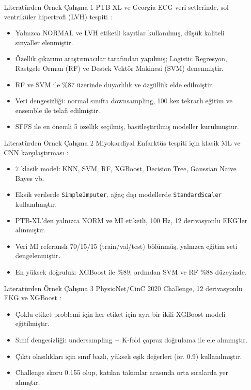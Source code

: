 \documentclass[aspectratio=169]{beamer}
\begin{document}
\begin{frame}{Literatürden Örnek Çalışma 1}
		PTB-XL ve Georgia ECG veri setlerinde, sol ventriküler hipertrofi (LVH) tespiti \cite{taconne2024-lvh}:
	\begin{itemize}
		\item Yalnızca NORMAL ve LVH etiketli kayıtlar kullanılmış, düşük kaliteli sinyaller elenmiştir.
		\item Özellik çıkarımı araştırmacılar tarafından yapılmış; Logistic Regresyon, Rastgele Orman (RF) ve Destek Vektör Makinesi (SVM) denenmiştir.
		\item RF ve SVM ile \%87 üzerinde duyarlılık ve özgüllük elde edilmiştir.
		\item Veri dengesizliği: normal sınıfta downsampling, 100 kez tekrarlı eğitim ve ensemble ile telafi edilmiştir.
		\item SFFS ile en önemli 5 özellik seçilmiş, basitleştirilmiş modeller kurulmuştur.
	\end{itemize}
\end{frame}

\begin{frame}{Literatürden Örnek Çalışma 2}
		Miyokardiyal Enfarktüs tespiti için klasik ML ve CNN karşılaştırması \cite{osterlund2025-mi-ptbxl}:
	\begin{itemize}
		\item 7 klasik model: KNN, SVM, RF, XGBoost, Decision Tree, Gaussian Naive Bayes vb.
		\item Eksik verilerde \texttt{SimpleImputer}, ağaç dışı modellerde \texttt{StandardScaler} kullanılmıştır.
		\item PTB-XL'den yalnızca NORM ve MI etiketli, 100 Hz, 12 derivasyonlu EKG'ler alınmıştır.
		\item Veri MI referanslı 70/15/15 (train/val/test) bölünmüş, yalnızca eğitim seti dengelenmiştir.
		\item En yüksek doğruluk: XGBoost ile \%89; ardından SVM ve RF \%88 düzeyinde.
	\end{itemize}
\end{frame}

\begin{frame}{Literatürden Örnek Çalışma 3}
		PhysioNet/CinC 2020 Challenge, 12 derivasyonlu EKG ve XGBoost \cite{raipal2020-xgboost-cinc}:
	\begin{itemize}
		\item Çoklu etiket problemi için her etiket için ayrı bir ikili XGBoost modeli eğitilmiştir.
		\item Sınıf dengesizliği: undersampling + K-fold çapraz doğrulama ile ele alınmıştır.
		\item Çıktı olasılıkları için sınıf bazlı, yüksek eşik değerleri (ör. 0.9) kullanılmıştır.
		\item Challenge skoru 0.155 olup, katılan takımlar arasında orta sıralarda yer almıştır.
	\end{itemize}
\end{frame}
\end{document}
